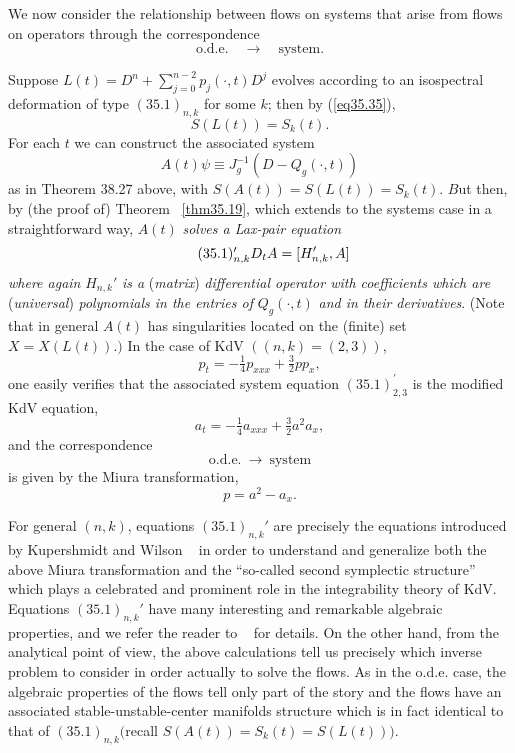 \documentclass{surv-l}
\theoremstyle{plain}
\theoremstyle{definition}
\numberwithin{equation}{chapter}
\begin{document}
We now consider the relationship between flows on systems that arise from flows on operators through the correspondence
\begin{equation*}
\mathrm{o.d.e}.\quad \rightarrow\quad \mathrm{system}.
\end{equation*}

Suppose $L(t)=D^{n}+\sum_{j=0}^{n-2}p_{j}(\cdot,t)D^{j}$ evolves according to an isospectral deformation of type $(35.1)_{n,k}$ for some $k$; then by (\ref{eq35.35}),
\begin{equation*}
S(L(t))=S_{k}(t).
\end{equation*}
For each $t$ we can construct the associated system
\begin{equation*}
A(t)\psi\equiv J_{g}^{-1}(D-Q_{g}(\cdot, t))
\end{equation*}
as in Theorem 38.27 above, with $S(A(t))=S(L(t))=S_{k}(t)$. $B$ut then, by (the proof of) Theorem ~\ref{thm35.19}, which extends to the systems case in a straightforward way, $A(t)$ \emph{solves a Lax-pair equation}
\begin{equation}\label{eq35.1}
 \tag*{(35.1)$^{\prime}_{n,k}$}D_{t}A=[H_{n,k}',A]
\end{equation}
\emph{where again} $H_{n,k}'$ \emph{is a} (\emph{matrix}) \emph{differential operator with coefficients which are} (\emph{universal}) \emph{polynomials in the entries of} $Q_{g}(\cdot, t)$ \emph{and in their derivatives}. (Note that in general $A(t)$ has singularities located on the (finite) set $X=X(L(t)).)$ In the case of KdV $((n,k)=(2,3))$,
\begin{equation*}
p_{t}=-\tfrac{1}{4}p_{xxx}+\tfrac{3}{2}pp_{x},
\end{equation*}
one easily verifies that the associated system equation $(35.1)_{2,3}^{\prime}$ is the modified KdV equation,
\begin{equation*}
a_{t}=-\tfrac{1}{4}a_{xxx}+\tfrac{3}{2}a^{2}a_{x},
\end{equation*}
and the correspondence
\begin{equation*}
\mathrm{o.d.e}.\ \rightarrow\ \mathrm{system}
\end{equation*}
is given by the Miura transformation,
\begin{equation*}
p=a^{2}-a_{x}.
\end{equation*}

For general $(n, k)$, equations $(35.1)_{n,k}'$ are precisely the equations introduced by Kupershmidt and Wilson ~\cite{KW} in order to understand and generalize both the above Miura transformation and the ``so-called second symplectic structure'' which plays a celebrated and prominent role in the integrability theory of KdV. Equations $(35.1)_{n,k}'$ have many interesting and remarkable algebraic properties, and we refer the reader to ~\cite{KW} for details. On the other hand, from the analytical point of view, the above calculations tell us precisely which inverse problem to consider in order actually to solve the flows. As in the o.d.e. case, the algebraic properties of the flows tell only part of the story and the flows have an associated stable-unstable-center manifolds structure which is in fact identical to that of $(35.1)_{n,k} ($recall $S(A(t))=S_{k}(t)=S(L(t)))$.
\end{document}
